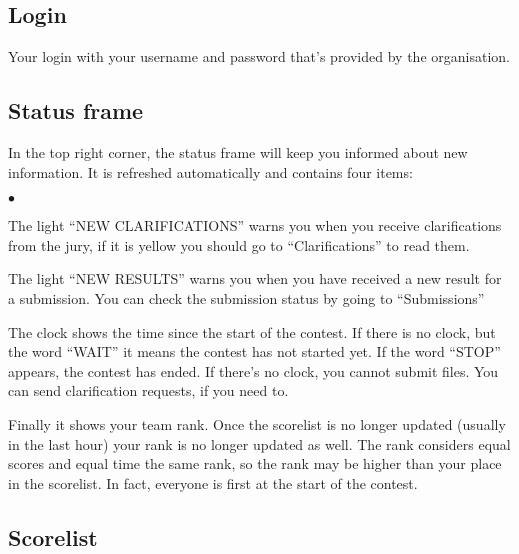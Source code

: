 \documentclass[a4paper]{artikel3}
\newenvironment{citemize}
  {\begin{list}{$\bullet$}{\topsep 0cm \itemsep 0cm}}
  {\end{list}}
\begin{document}
\subsection{Login}
\vspace{-0.2cm}

Your login with your username and password that's provided by the
organisation.

\vspace{-0.3cm}
\subsection{Status frame}
\vspace{-0.2cm}

In the top right corner, the status frame will keep you informed about new
information. It is refreshed automatically and contains four items:

\begin{citemize}
\item The light ``NEW CLARIFICATIONS'' warns you when you receive
clarifications from the jury, if it is yellow you should go to
``Clarifications'' to read them.

\item The light ``NEW RESULTS'' warns you when you have received a new result
for a submission. You can check the submission status by going to
``Submissions''

\item The clock shows the time since the start of the contest. If there is
no clock, but the word ``WAIT'' it means the contest has not started yet. If
the word ``STOP'' appears, the contest has ended. If there's no clock, you
cannot submit files. You can send clarification requests, if you need to.

\item Finally it shows your team rank. Once the scorelist is no longer
updated (usually in the last hour) your rank is no longer updated as well.
The rank considers equal scores and equal time the same rank, so the rank
may be higher than your place in the scorelist. In fact, everyone is first
at the start of the contest.

\end{citemize}

\vspace{-0.3cm}
\subsection{Scorelist}
\vspace{-0.2cm}
\end{document}
